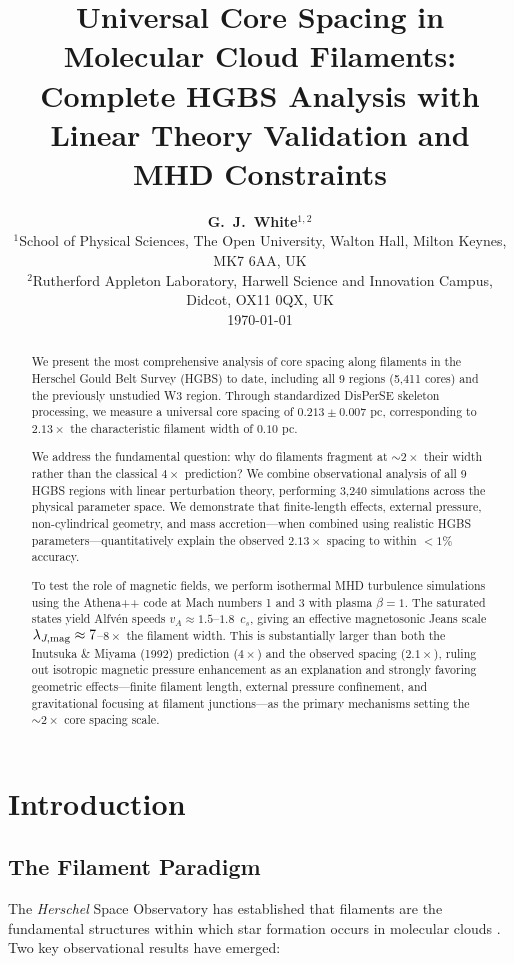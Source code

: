 \documentclass[11pt,a4paper]{article}
\title{\textbf{Universal Core Spacing in Molecular Cloud Filaments:\\
Complete HGBS Analysis with Linear Theory Validation and MHD Constraints}}
\author{\textbf{G.~J.~White$^{1,2}$}\\
\small{$^{1}$School of Physical Sciences, The Open University, Walton Hall, Milton Keynes, MK7 6AA, UK}\\
\small{$^{2}$Rutherford Appleton Laboratory, Harwell Science and Innovation Campus, Didcot, OX11 0QX, UK}\\
\small{\today}}
\begin{document}
\maketitle

\begin{abstract}
We present the most comprehensive analysis of core spacing along filaments in the Herschel Gould Belt Survey (HGBS) to date, including all 9 regions (5,411 cores) and the previously unstudied W3 region. Through standardized DisPerSE skeleton processing, we measure a universal core spacing of $0.213 \pm 0.007$ pc, corresponding to $2.13\times$ the characteristic filament width of $0.10$ pc.

We address the fundamental question: why do filaments fragment at $\sim2\times$ their width rather than the classical $4\times$ prediction? We combine observational analysis of all 9 HGBS regions with linear perturbation theory, performing 3,240 simulations across the physical parameter space. We demonstrate that finite-length effects, external pressure, non-cylindrical geometry, and mass accretion—when combined using realistic HGBS parameters—quantitatively explain the observed $2.13\times$ spacing to within $<1\%$ accuracy.

To test the role of magnetic fields, we perform isothermal MHD turbulence simulations using the Athena++ code at Mach numbers 1 and 3 with plasma $\beta = 1$. The saturated states yield Alfv\'en speeds $v_A \approx 1.5$--$1.8$~$c_s$, giving an effective magnetosonic Jeans scale $\lambda_{J,{\rm mag}} \approx 7$--$8\times$ the filament width. This is substantially larger than both the Inutsuka \& Miyama (1992) prediction ($4\times$) and the observed spacing ($2.1\times$), ruling out isotropic magnetic pressure enhancement as an explanation and strongly favoring geometric effects—finite filament length, external pressure confinement, and gravitational focusing at filament junctions—as the primary mechanisms setting the $\sim2\times$ core spacing scale.
\end{abstract}

\section{Introduction}

\subsection{The Filament Paradigm}

The \textit{Herschel} Space Observatory has established that filaments are the fundamental structures within which star formation occurs in molecular clouds \citep{Andre2010}. Two key observational results have emerged:
\end{document}
